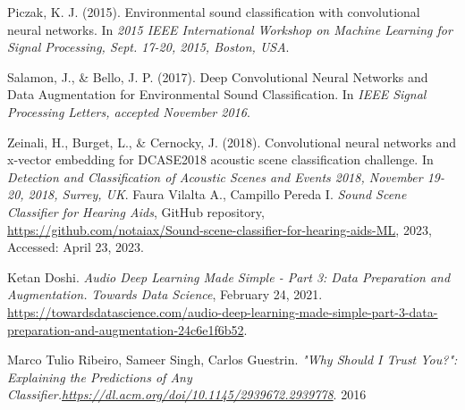 \documentclass[12pt,oneside,a4paper,english]{article}
\begin{document}
\newpage
\begin{thebibliography}{9}

Piczak, K. J. (2015). Environmental sound classification with convolutional neural networks. In \textit{2015 IEEE International Workshop on Machine Learning for Signal Processing, Sept. 17-20, 2015, Boston, USA}.

Salamon, J., \& Bello, J. P. (2017). Deep Convolutional Neural Networks and Data Augmentation for Environmental Sound
Classification. In \textit{IEEE Signal Processing Letters, accepted November 2016}.

Zeinali, H., Burget, L., & Cernocky, J. (2018). Convolutional neural networks and x-vector embedding for DCASE2018 acoustic scene classification challenge. In \textit{Detection and Classification of Acoustic Scenes and Events 2018, November 19-20, 2018, Surrey, UK}.
Faura Vilalta A., Campillo Pereda I.
\textit{Sound Scene Classifier for Hearing Aids},
GitHub repository,
\url{https://github.com/notaiax/Sound-scene-classifier-for-hearing-aids-ML},
2023,
Accessed: April 23, 2023.

Ketan Doshi. \textit{Audio Deep Learning Made Simple - Part 3: Data Preparation and Augmentation.}
\textit{Towards Data Science}, February 24, 2021.
\url{https://towardsdatascience.com/audio-deep-learning-made-simple-part-3-data-preparation-and-augmentation-24c6e1f6b52}.

Marco Tulio Ribeiro, Sameer Singh, Carlos Guestrin. \emph{"Why Should I Trust You?": Explaining the Predictions of Any Classifier.\url{https://dl.acm.org/doi/10.1145/2939672.2939778}}. 2016

\end{thebibliography}
\end{document}
